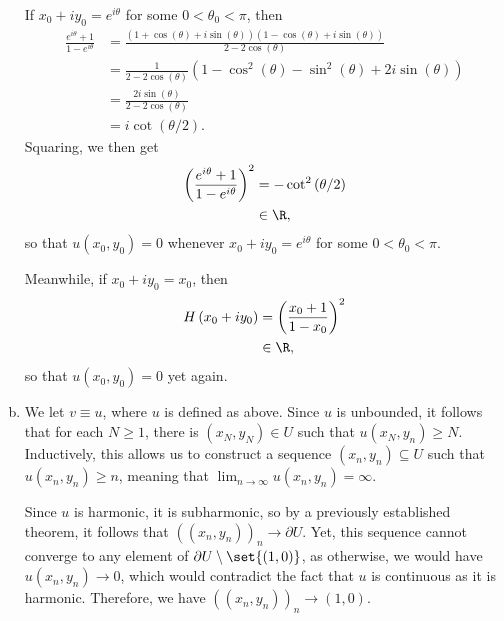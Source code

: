 \documentclass[10pt]{mypackage}
\begin{document}
\begin{solution}
\begin{enumerate}[(a)]
      If $x_0 + iy_0 = e^{i\theta}$ for some $0 < \theta_0 < \pi$, then
      \begin{align*}
        \frac{e^{i\theta} + 1}{1-e^{i\theta}} &= \frac{\left( 1 + \cos\left( \theta \right) + i\sin\left( \theta \right) \right)\left( 1 - \cos\left( \theta \right) + i\sin\left( \theta \right) \right)}{2-2\cos\left( \theta \right)}\\
                                              &= \frac{1}{2-2\cos\left( \theta \right)} \left( 1-\cos^2\left( \theta \right)-\sin^2\left( \theta \right) + 2i\sin\left( \theta \right) \right)\\
                                              &= \frac{2i\sin\left( \theta \right)}{2-2\cos\left( \theta \right)}\\
                                              &= i\cot\left( \theta/2 \right).
      \end{align*}
      Squaring, we then get
      \begin{align*}
        \left( \frac{e^{i\theta} + 1}{1-e^{i\theta}} \right)^2 &= -\cot^2\left( \theta/2 \right)\\
                                                               &\in \R,
      \end{align*}
      so that $u\left( x_0,y_0 \right) = 0$ whenever $x_0 + iy_0 = e^{i\theta}$ for some $0 < \theta_0 < \pi$.\newline

      Meanwhile, if $x_0 + iy_0 = x_0$, then
      \begin{align*}
        H\left( x_0 + iy_0 \right) &= \left( \frac{x_0 + 1}{1-x_0} \right)^2\\
                                   &\in \R,
      \end{align*}
      so that $u\left( x_0,y_0 \right) = 0$ yet again.
    \item We let $v \equiv u$, where $u$ is defined as above. Since $u$ is unbounded, it follows that for each $N\geq 1$, there is $\left( x_N,y_N \right)\in U$ such that $u\left( x_N,y_n \right) \geq N$. Inductively, this allows us to construct a sequence $\left( x_n,y_n \right)\subseteq U$ such that $u\left( x_n,y_n \right) \geq n$, meaning that $\lim_{n\rightarrow\infty}u\left( x_n,y_n \right) =\infty$.\newline

      Since $u$ is harmonic, it is subharmonic, so by a previously established theorem, it follows that $\left( \left( x_n,y_n \right) \right)_n\rightarrow \partial U$. Yet, this sequence cannot converge to any element of $\partial U\setminus \set{\left( 1,0 \right)}$, as otherwise, we would have $u\left( x_n,y_n \right)\rightarrow 0$, which would contradict the fact that $u$ is continuous as it is harmonic. Therefore, we have $\left( \left( x_n,y_n \right) \right)_{n}\rightarrow \left( 1,0 \right)$.
  \end{enumerate}
\end{solution}
\end{document}
